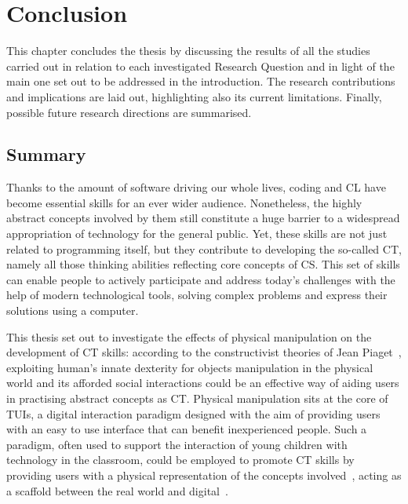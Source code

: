 %
\setcounter{chapter}{5}
\chapter{Conclusion}\label{chap:conclusion}


This chapter concludes the thesis by discussing the results of all the studies carried out in relation to each investigated Research Question and in light of the main one set out to be addressed in the introduction. The research contributions and implications are laid out, highlighting also its current limitations. Finally, possible future research directions are summarised.

\section{Summary}
Thanks to the amount of software driving our whole lives, coding and \ac{CL} have become essential skills for an ever wider audience. Nonetheless, the highly abstract concepts involved by them still constitute a huge barrier to a widespread appropriation of technology for the general public. Yet, these skills are not just related to programming itself, but they contribute to developing the so-called \acl{CT}, namely all those thinking abilities reflecting core concepts of \ac{CS}. This set of skills can enable people to actively participate and address today's challenges with the help of modern technological tools, solving complex problems and express their solutions using a computer.

This thesis set out to investigate the effects of physical manipulation on the development of \ac{CT} skills: according to the constructivist theories of Jean Piaget~\cite{Piaget:1969vq}, exploiting human's innate dexterity for objects manipulation in the physical world and its afforded social interactions could be an effective way of aiding users in practising abstract concepts as \ac{CT}. Physical manipulation sits at the core of \acp{TUI}, a digital interaction paradigm designed with the aim of providing users with an easy to use interface that can benefit inexperienced people. Such a paradigm, often used to support the interaction of young children with technology in the classroom, could be employed to promote \ac{CT} skills by providing users with a physical representation of the concepts involved~\cite{McNerney:2004jc,Horn:2009be}, acting as a scaffold between the real world and digital~\cite{Wang:2014jy}.

